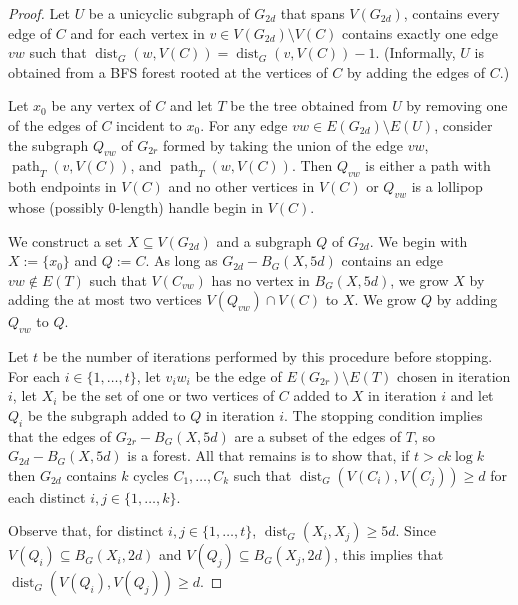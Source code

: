 \documentclass{patmorin}
\renewcommand{\ge}{\geqslant}
\DeclareMathOperator{\pth}{path}
\DeclareMathOperator{\dist}{dist}
\begin{document}
\begin{proof}
  Let $U$ be a unicyclic subgraph of $G_{2d}$ that spans $V(G_{2d})$, contains every edge of $C$ and for each vertex in $v\in V(G_{2d})\setminus V(C)$ contains exactly one edge $vw$ such that $\dist_G(w,V(C))=\dist_G(v,V(C))-1$.  (Informally, $U$ is obtained from a BFS forest rooted at the vertices of $C$ by adding the edges of $C$.)

  Let $x_0$ be any vertex of $C$ and let $T$ be the tree obtained from $U$ by removing one of the edges of $C$ incident to $x_0$.  For any edge $vw\in E(G_{2d})\setminus E(U)$, consider the subgraph $Q_{vw}$ of $G_{2r}$ formed by taking the union of the edge $vw$, $\pth_T(v,V(C))$, and $\pth_T(w,V(C))$. Then $Q_{vw}$ is either a path with both endpoints in $V(C)$ and no other vertices in $V(C)$ or $Q_{vw}$ is a lollipop whose (possibly $0$-length) handle begin in $V(C)$.

  We construct a set $X\subseteq V(G_{2d})$ and a subgraph $Q$ of $G_{2d}$. We begin with $X:=\{x_0\}$ and $Q:=C$.  As long as $G_{2d}-B_G(X,5d)$ contains an edge $vw\not\in E(T)$ such that $V(C_{vw})$ has no vertex in $B_G(X,5d)$, we grow $X$ by adding the at most two vertices $V(Q_{vw})\cap V(C)$ to $X$.  We grow $Q$ by adding $Q_{vw}$ to $Q$.

  Let $t$ be the number of iterations performed by this procedure before stopping.  For each $i\in\{1,\ldots,t\}$, let $v_iw_i$ be the edge of $E(G_{2r})\setminus E(T)$ chosen in iteration $i$, let $X_i$ be the set of one or two vertices of $C$ added to $X$ in iteration $i$ and let $Q_i$ be the subgraph added to $Q$ in iteration $i$.  The stopping condition implies that the edges of $G_{2r}-B_G(X,5d)$ are a subset of the edges of $T$, so $G_{2d}-B_G(X,5d)$ is a forest.  All that remains is to show that, if $t>ck\log k$ then $G_{2d}$ contains $k$ cycles $C_1,\ldots,C_k$ such that $\dist_G(V(C_i),V(C_j))\ge d$ for each distinct $i,j\in\{1,\ldots,k\}$.

  Observe that, for distinct $i,j\in\{1,\ldots,t\}$, $\dist_G(X_i,X_j)\ge 5d$.  Since $V(Q_i)\subseteq B_G(X_i,2d)$ and $V(Q_j)\subseteq B_G(X_j,2d)$, this implies that $\dist_G(V(Q_i),V(Q_j))\ge d$.


\end{proof}
\end{document}
